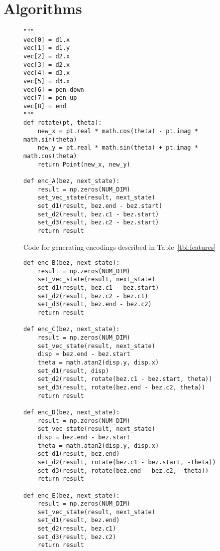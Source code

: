 \chapter{Algorithms}\label{app:enc}

\begin{figure}[h]
    \caption{Code for generating encodings described in Table~\ref{tbl:features}\label{appfig:features-code}}
\begin{verbatim}
"""
vec[0] = d1.x
vec[1] = d1.y
vec[2] = d2.x
vec[3] = d2.x
vec[4] = d3.x
vec[5] = d3.x
vec[6] = pen_down
vec[7] = pen_up
vec[8] = end
"""
def rotate(pt, theta):
    new_x = pt.real * math.cos(theta) - pt.imag * math.sin(theta)
    new_y = pt.real * math.sin(theta) + pt.imag * math.cos(theta)
    return Point(new_x, new_y)

def enc_A(bez, next_state):
    result = np.zeros(NUM_DIM)
    set_vec_state(result, next_state)
    set_d1(result, bez.end - bez.start)
    set_d2(result, bez.c1 - bez.start)
    set_d3(result, bez.c2 - bez.start)
    return result
\end{verbatim}
\end{figure}

\begin{figure}[h]
\begin{verbatim}
def enc_B(bez, next_state):
    result = np.zeros(NUM_DIM)
    set_vec_state(result, next_state)
    set_d1(result, bez.c1 - bez.start)
    set_d2(result, bez.c2 - bez.c1)
    set_d3(result, bez.end - bez.c2)
    return result

def enc_C(bez, next_state):
    result = np.zeros(NUM_DIM)
    set_vec_state(result, next_state)
    disp = bez.end - bez.start
    theta = math.atan2(disp.y, disp.x)
    set_d1(result, disp)
    set_d2(result, rotate(bez.c1 - bez.start, theta))
    set_d3(result, rotate(bez.end - bez.c2, theta))
    return result

def enc_D(bez, next_state):
    result = np.zeros(NUM_DIM)
    set_vec_state(result, next_state)
    disp = bez.end - bez.start
    theta = math.atan2(disp.y, disp.x)
    set_d1(result, bez.end)
    set_d2(result, rotate(bez.c1 - bez.start, -theta))
    set_d3(result, rotate(bez.end - bez.c2, -theta))
    return result

def enc_E(bez, next_state):
    result = np.zeros(NUM_DIM)
    set_vec_state(result, next_state)
    set_d1(result, bez.end)
    set_d2(result, bez.c1)
    set_d3(result, bez.c2)
    return result
\end{verbatim}
\end{figure}

\clearpage
\newpage
